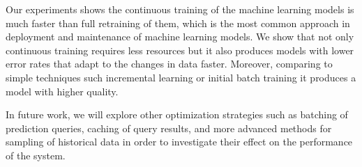 \documentclass{vldb}
\begin{document}
Our experiments shows the continuous training of the machine learning models is much faster than full retraining of them, which is the most common approach in deployment and maintenance of machine learning models. 
We show that not only continuous training requires less resources but it also produces models with lower error rates that adapt to the changes in data faster.
Moreover, comparing to simple techniques such incremental learning or initial batch training it produces a model with higher quality.

In future work, we will explore other optimization strategies such as batching of prediction queries, caching of query results, and more advanced methods for sampling of historical data in order to investigate their effect on the performance of the system.


\end{document}

